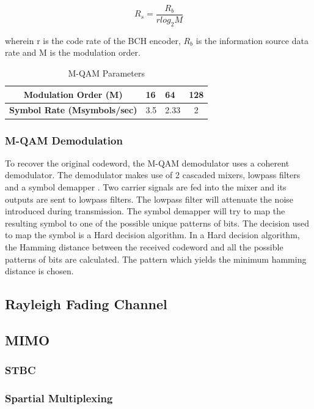 \documentclass[pdftex,11pt,a4paper]{article}
\begin{document}
\begin{equation}
	R_s = \frac{R_b}{rlog_{2}M}
\end{equation}

wherein r is the code rate of the BCH encoder, \(R_b\) is the information source data rate and M is the modulation order.

\begin{table}[]
	\centering
	\caption{M-QAM Parameters}
	\label{1}
	\begin{tabular}{|c|l|l|l|}
		\hline
		\textbf{Modulation Order (M)}       & 16                       & 64                        & 128                    \\ \hline
		\textbf{Symbol Rate (Msymbols/sec)} & \multicolumn{1}{r|}{3.5} & \multicolumn{1}{c|}{2.33} & \multicolumn{1}{c|}{2} \\ \hline
	\end{tabular}
\end{table}
\subsubsection{M-QAM Demodulation}
To recover the original codeword, the M-QAM demodulator uses a coherent demodulator. The demodulator makes use of 2 cascaded mixers, lowpass filters and a symbol demapper \cite{B15}. Two carrier  signals are fed into the mixer and its outputs are sent to lowpass filters. The lowpass filter will attenuate the noise introduced during transmission. The symbol demapper will try to map the resulting symbol to one of the possible unique patterns of bits. The decision used to map the symbol is a Hard decision algorithm. In a Hard decision algorithm, the Hamming distance between the received codeword and all the possible patterns of bits are calculated. The pattern which yields the minimum hamming distance is chosen.

\subsection{Rayleigh Fading Channel}

\subsection{MIMO}


\subsubsection{STBC}
\subsubsection{Spartial Multiplexing}
\end{document}

